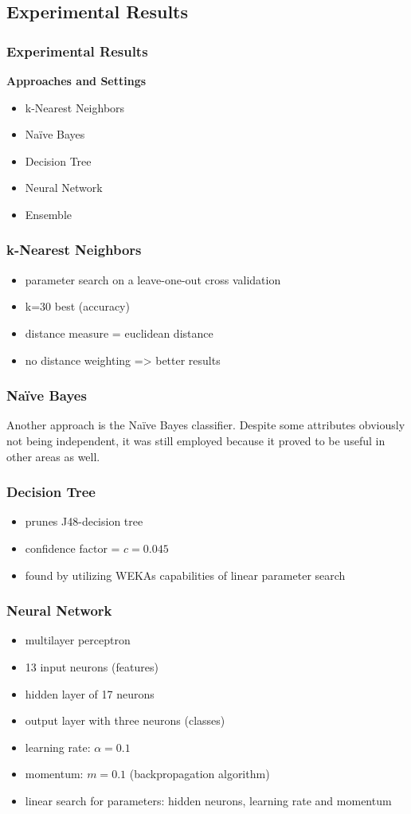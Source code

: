 \mode*
\begin{frame}
 	\section{Experimental Results}
 	\frametitle{Experimental Results}
	\textbf{Approaches and Settings}
	\begin{itemize}
		\item k-Nearest Neighbors
		\item Na\"ive Bayes
		\item Decision Tree
		\item Neural Network
		\item Ensemble
	\end{itemize}
\end{frame}

\begin{frame}
	\frametitle{k-Nearest Neighbors}
	\begin{itemize}
		\item parameter search on a leave-one-out cross validation
		\item k=30 best (accuracy)
		\item distance measure = euclidean distance
		\item no distance weighting => better results
	\end{itemize}
\end{frame}

\begin{frame}
	\frametitle{Na\"ive Bayes}
	Another approach is the Na\"ive Bayes classifier. Despite some
	attributes obviously not being independent, it was still employed
	because it proved to be useful in other areas as well.
\end{frame}

\begin{frame}[fragile]
	\frametitle{Decision Tree}
	\begin{itemize}
		\item prunes J48-decision tree
		\item confidence factor =  \(c=0.045\)
		\item found by utilizing WEKAs capabilities of linear
		parameter search
	\end{itemize}
\end{frame}

\begin{frame}[fragile]
	\frametitle{Neural Network}
	\begin{itemize}
		\item multilayer perceptron
		\item 13 input neurons (features)
		\item hidden layer of 17 neurons
		\item output layer with three neurons (classes)
		\item learning rate: \(\alpha=0.1\)
		\item momentum:  \(m=0.1\) (backpropagation algorithm)
		\item linear search for parameters: hidden neurons, learning rate and momentum
	\end{itemize}
\end{frame}

